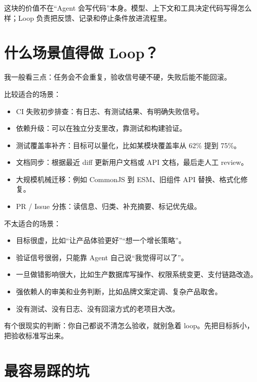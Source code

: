 \documentclass[10pt,a4paper]{ctexart}
\begin{document}
这块的价值不在“Agent 会写代码”本身。模型、上下文和工具决定代码写得怎么样；Loop 负责把反馈、记录和停止条件放进流程里。



\section{什么场景值得做 Loop？}


我一般看三点：任务会不会重复，验收信号硬不硬，失败后能不能回滚。



比较适合的场景：


\begin{itemize}[itemsep=2pt, topsep=4pt]
  \item CI 失败初步排查：有日志、有测试结果、有明确失败信号。
  \item 依赖升级：可以在独立分支里改，靠测试和构建验证。
  \item 测试覆盖率补齐：目标可以量化，比如某模块覆盖率从 62\% 提到 75\%。
  \item 文档同步：根据最近 diff 更新用户文档或 API 文档，最后走人工 review。
  \item 大规模机械迁移：例如 CommonJS 到 ESM、旧组件 API 替换、格式化修复。
  \item PR / Issue 分拣：读信息、归类、补充摘要、标记优先级。
\end{itemize}


不太适合的场景：


\begin{itemize}[itemsep=2pt, topsep=4pt]
  \item 目标很虚，比如“让产品体验更好”“想一个增长策略”。
  \item 验证信号很弱，只能靠 Agent 自己说“我觉得可以了”。
  \item 一旦做错影响很大，比如生产数据库写操作、权限系统变更、支付链路改造。
  \item 强依赖人的审美和业务判断，比如品牌文案定调、复杂产品取舍。
  \item 没有测试、没有日志、没有回滚方式的老项目大改。
\end{itemize}


有个很现实的判断：你自己都说不清怎么验收，就别急着 loop。先把目标拆小，把验收标准写出来。



\section{最容易踩的坑}
\end{document}
